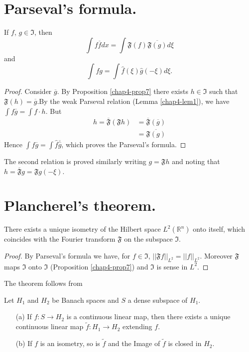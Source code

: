 \section*{Parseval's formula.}

\begin{proposition}\label{chap4-prop8}
If $f$, $g\in \mathfrak{I}$, then
$$
\int f\overline{f}dx=\int \mathfrak{F}(f)\overline{\mathfrak{F}(g)}d\xi
$$
and 
$$
\int fg=\int \widehat{f}(\xi)\widehat{g}(-\xi)d\xi.
$$
\end{proposition}

\begin{proof}
Consider $\overline{g}$. By Proposition \ref{chap4-prop7} there exists
$h\in \mathfrak{I}$ such that
$\mathfrak{F}(h)=\overline{g}$.\pageoriginale By the weak Parseval
relation (Lemma \ref{chap4-lem1}), we have $\int f\overline{g}=\int
f\cdot h$. But
\begin{align*}
h =\overline{\mathfrak{F}}(\mathfrak{F}h) &=
\overline{\mathfrak{F}}(\overline{g})\\[4pt]
&= \overline{\mathfrak{F}(g)}
\end{align*}
Hence $\int f\overline{g}=\int \widehat{f}\overline{\widehat{g}}$,
which proves the Parseval's formula.
\end{proof}

The second relation is proved similarly writing $g=\mathfrak{F}h$ and
noting that $h=\overline{\mathfrak{F}}g=\mathfrak{F}g(-\xi)$.

\section*{Plancherel's theorem.}

\begin{theorem}\label{chap4-thm2}
There exists a unique isometry of the Hilbert space
$L^{2}(\mathbb{R}^{n})$ onto itself, which coincides with the Fourier
transform $\mathfrak{F}$ on the subspace $\mathfrak{I}$.
\end{theorem}

\begin{proof}
By Parseval's formula we have, for $f\in \mathfrak{I}$,
$||\mathfrak{F}f||_{L^{2}}=||f||_{L^{2}}$. Moreover $\mathfrak{F}$
maps $\mathfrak{I}$ onto $\mathfrak{I}$ (Proposition
\ref{chap4-prop7}) and $\mathfrak{I}$ is sense in $L^{2}$. 
\end{proof}

The theorem follows from

\begin{exer*}
Let $H_{1}$ and $H_{2}$ be Banach spaces and $S$ a dense subspace of
$H_{1}$.
\begin{itemize}
\item[(a)] If $f:S\to H_{2}$ is a continuous linear map, then there
  exists a unique continuous linear map $\widetilde{f}:H_{1}\to H_{2}$
  extending $f$.

\item[(b)] If $f$ is an isometry, so is $\widetilde{f}$ and the Image
  of $\widetilde{f}$ is closed in $H_{2}$.
\end{itemize}
\end{exer*}

